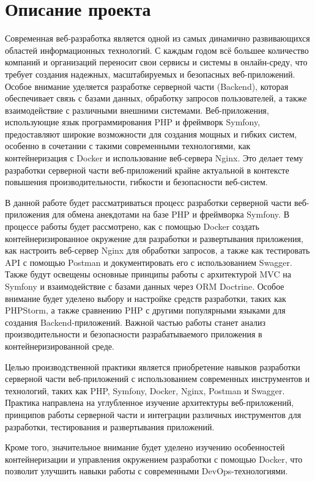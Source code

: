 \documentclass[pract]{SCWorks}
\begin{document}
\section{Описание проекта}

Современная веб-разработка является одной из самых динамично развивающихся 
областей информационных технологий. С каждым годом всё большее количество
компаний и организаций переносит свои сервисы и системы в онлайн-среду,
что требует создания надежных, масштабируемых и безопасных веб-приложений.
Особое внимание уделяется разработке серверной части (Backend), 
которая обеспечивает связь с базами данных, обработку запросов 
пользователей, а также взаимодействие с различными внешними системами. 
Веб-приложения, использующие язык программирования PHP и фреймворк 
Symfony, предоставляют широкие возможности для создания мощных и гибких
систем, особенно в сочетании с такими современными технологиями, как 
контейнеризация с Docker и использование веб-сервера Nginx. Это делает 
тему разработки серверной части веб-приложений крайне актуальной в 
контексте повышения производительности, гибкости и безопасности
веб-систем.

В данной работе будет рассматриваться процесс разработки серверной
части веб-приложения для обмена анекдотами на базе PHP и фреймворка 
Symfony. В процессе работы будет рассмотрено, как с помощью Docker
создать контейнеризированное окружение для разработки и развертывания
приложения, как настроить веб-сервер Nginx для обработки запросов, а также
как тестировать API с помощью Postman и документировать его с использованием
Swagger. Также будут освещены основные принципы работы с архитектурой 
MVC на Symfony и взаимодействие с базами данных через ORM Doctrine. 
Особое внимание будет уделено выбору и настройке средств разработки, 
таких как PHPStorm, а также сравнению PHP с другими популярными языками 
для создания Backend-приложений. Важной частью работы станет анализ 
производительности и безопасности разрабатываемого приложения в
контейнеризированной среде.

Целью производственной практики является приобретение навыков разработки 
серверной части веб-приложений с использованием современных инструментов 
и технологий, таких как PHP, Symfony, Docker, Nginx, Postman и Swagger. 
Практика направлена на углубленное изучение архитектуры веб-приложений, 
принципов работы серверной части и интеграции различных инструментов 
для разработки, тестирования и развертывания приложений.

Кроме того, значительное внимание будет уделено изучению особенностей
контейнеризации и управления окружением разработки с помощью Docker,
что позволит улучшить навыки работы с современными DevOps-технологиями.
\end{document}
